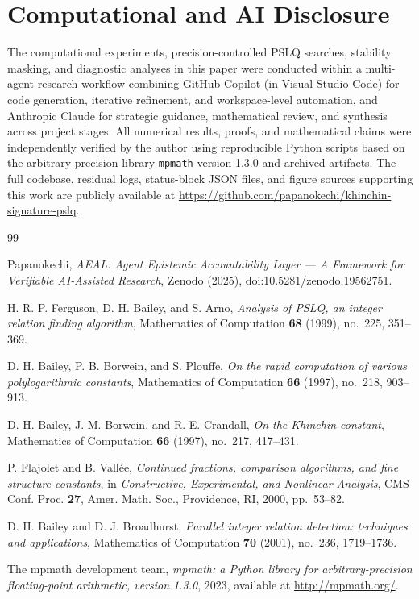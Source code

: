 \documentclass[11pt]{article}
\begin{document}
\section*{Computational and AI Disclosure}

The computational experiments, precision-controlled PSLQ searches, stability masking, and diagnostic analyses in this paper were conducted within a multi-agent research workflow combining GitHub Copilot (in Visual Studio Code) for code generation, iterative refinement, and workspace-level automation, and Anthropic Claude for strategic guidance, mathematical review, and synthesis across project stages. All numerical results, proofs, and mathematical claims were independently verified by the author using reproducible Python scripts based on the arbitrary-precision library \texttt{mpmath} version 1.3.0 \cite{mpmath2023} and archived artifacts. The full codebase, residual logs, status-block JSON files, and figure sources supporting this work are publicly available at \url{https://github.com/papanokechi/khinchin-signature-pslq}.


\begin{thebibliography}{99}

Papanokechi,
\emph{AEAL: Agent Epistemic Accountability Layer --- A Framework for Verifiable AI-Assisted Research},
Zenodo (2025), doi:10.5281/zenodo.19562751.

H. R. P. Ferguson, D. H. Bailey, and S. Arno,
\emph{Analysis of PSLQ, an integer relation finding algorithm},
Mathematics of Computation \textbf{68} (1999), no.~225, 351--369.

D. H. Bailey, P. B. Borwein, and S. Plouffe,
\emph{On the rapid computation of various polylogarithmic constants},
Mathematics of Computation \textbf{66} (1997), no.~218, 903--913.

D. H. Bailey, J. M. Borwein, and R. E. Crandall,
\emph{On the Khinchin constant},
Mathematics of Computation \textbf{66} (1997), no.~217, 417--431.

P. Flajolet and B. Vall\'ee,
\emph{Continued fractions, comparison algorithms, and fine structure constants},
in \emph{Constructive, Experimental, and Nonlinear Analysis}, CMS Conf. Proc. \textbf{27},
Amer. Math. Soc., Providence, RI, 2000, pp.~53--82.

D. H. Bailey and D. J. Broadhurst,
\emph{Parallel integer relation detection: techniques and applications},
Mathematics of Computation \textbf{70} (2001), no.~236, 1719--1736.

The mpmath development team,
\emph{mpmath: a Python library for arbitrary-precision floating-point arithmetic, version 1.3.0},
2023, available at \url{http://mpmath.org/}.

\end{thebibliography}
\end{document}
